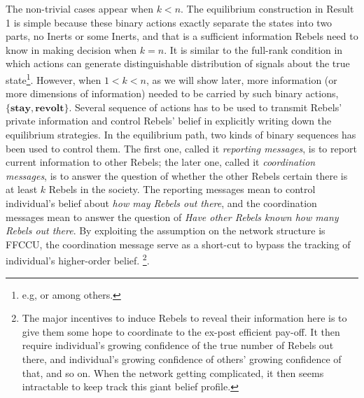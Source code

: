 \documentclass[12pt,letter]{article}
\theoremstyle{definition}
\theoremstyle{remark}
\theoremstyle{claim}
\begin{document}
The non-trivial cases appear when $k<n$. The equilibrium construction in Result 1 is simple because these binary actions exactly separate the states into two parts, no Inerts or some Inerts, and that is a sufficient information Rebels need to know in making decision when $k=n$. It is similar to the full-rank condition in which actions can generate distinguishable distribution of signals about the true state\footnote{e.g, \citep{Fudenberg2010} or \citep{Fudenberg2011} among others.}. However, when $1<k<n$, as we will show later, more information (or more dimensions of information) needed to be carried by such binary actions, $\{\textbf{stay},\textbf{revolt}\}$. Several sequence of actions has to be used to transmit Rebels' private information and control Rebels' belief in explicitly writing down the equilibrium strategies. In the equilibrium path, two kinds of binary sequences has been used to control them. The first one, called it \textit{reporting messages}, is to report current information to other Rebels; the later one, called it \textit{coordination messages}, is to answer the question of whether the other Rebels certain there is at least $k$ Rebels in the society. The reporting messages mean to control individual's belief about \textit{how may Rebels out there}, and the  coordination messages mean to answer the question of \textit{Have other Rebels known how many Rebels out there}. By exploiting the assumption on the network structure is FFCCU, the coordination message serve as a short-cut to bypass the tracking of individual's higher-order belief. \footnote{The major incentives to induce Rebels to reveal their information here is to give them some hope to coordinate to the ex-post efficient pay-off. It then require individual's growing confidence of the true number of Rebels out there, and individual's growing confidence of others' growing confidence of that, and so on. When the network getting complicated, it then seems intractable to keep track this giant belief profile.}. 
\end{document}
